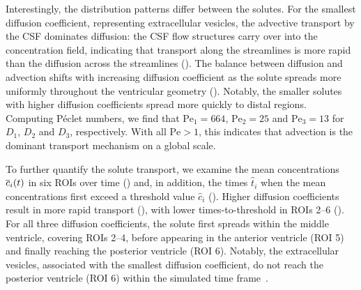 \documentclass{WileyMSP-template}
\begin{document}
Interestingly, the distribution patterns differ between the
solutes. For the smallest diffusion coefficient, representing
extracellular vesicles, the advective transport by the CSF dominates diffusion: the
CSF flow structures carry over into the concentration field,
indicating that transport along the streamlines is more rapid than the
diffusion across the streamlines (). The
balance between diffusion and advection shifts with increasing
diffusion coefficient as the solute spreads more uniformly throughout
the ventricular geometry (). Notably, the
smaller solutes with higher diffusion coefficients spread more quickly
to distal regions. Computing Péclet numbers, we find that
$\mathrm{Pe}_1=664$, $\mathrm{Pe}_2=25$ and $\mathrm{Pe}_3=13$ for
$D_1$, $D_2$ and $D_3$, respectively. With all $\mathrm{Pe} > 1$, this
indicates that advection is the dominant transport mechanism on a
global scale.

To further quantify the solute transport, we examine the mean
concentrations $\overline{c}_i(t)$ in six ROIs over time
() and, in addition, the times $\hat{t}_i$
when the mean concentrations first exceed a threshold value
$\hat{c}_i$ ().  Higher diffusion coefficients
result in more rapid transport (), with
lower times-to-threshold in ROIs 2--6 (). For
all three diffusion coefficients, the solute first spreads within the
middle ventricle, covering ROIs 2--4, before appearing in the anterior
ventricle (ROI 5) and finally reaching the posterior ventricle
(ROI 6). Notably, the extracellular vesicles, associated with the smallest diffusion
coefficient, do not reach the posterior ventricle (ROI 6) within the
simulated time frame~.
\end{document}
